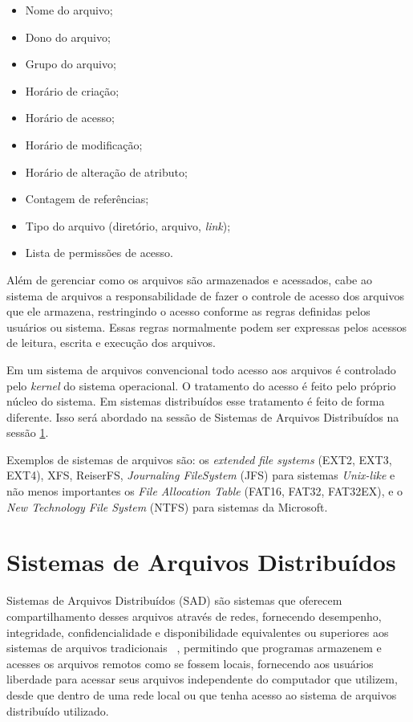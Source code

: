     \begin{itemize}
        \item Nome do arquivo;
        \item Dono do arquivo;
        \item Grupo do arquivo;
        \item Horário de criação;
        \item Horário de acesso;
        \item Horário de modificação;
        \item Horário de alteração de atributo;
        \item Contagem de referências;
        \item Tipo do arquivo (diretório, arquivo, \textit{link});
        \item Lista de permissões de acesso.
    \end{itemize}
    
    Além de gerenciar como os arquivos são armazenados e acessados, cabe ao sistema de arquivos a responsabilidade de fazer o controle de acesso dos arquivos que ele armazena, restringindo o acesso conforme as regras definidas pelos usuários ou sistema. Essas regras normalmente podem ser expressas pelos acessos de leitura, escrita e execução dos arquivos.
    
    Em um sistema de arquivos convencional todo acesso aos arquivos é controlado pelo \textit{kernel} do sistema operacional. O tratamento do acesso é feito pelo próprio núcleo do sistema. Em sistemas distribuídos esse tratamento é feito de forma diferente. Isso será abordado na sessão de Sistemas de Arquivos Distribuídos na sessão \ref{sad}.
    
    Exemplos de sistemas de arquivos são: os \textit{extended file systems} (EXT2, EXT3, EXT4), XFS, ReiserFS, \textit{Journaling FileSystem} (JFS) para sistemas \textit{Unix-like} e não menos importantes os \textit{File Allocation Table} (FAT16, FAT32, FAT32EX), e o \textit{New Technology File System} (NTFS) para sistemas da Microsoft.


	\section{Sistemas de Arquivos Distribuídos} \label{sad}

	 Sistemas de Arquivos Distribuídos (SAD) são sistemas que oferecem compartilhamento desses arquivos através de redes, fornecendo desempenho, integridade, confidencialidade e disponibilidade equivalentes ou superiores aos sistemas de arquivos tradicionais ~\cite{coulouris}, permitindo que programas armazenem e acesses os arquivos remotos como se fossem locais, fornecendo aos usuários liberdade para acessar seus arquivos independente do computador que utilizem, desde que dentro de uma rede local ou que tenha acesso ao sistema de arquivos distribuído utilizado.
	 
